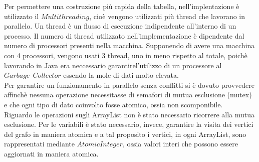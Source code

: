 Per permettere una costruzione pi\`u rapida della tabella, nell'implentazione \`e utilizzato il $ Multithreading $, cio\`e vengono utilizzati pi\`u thread che lavorano in parallelo.
Un thread \`e un flusso di esecuzione indipendente all'interno di un processo.
Il numero di thread utilizzato nell'implementazione \`e dipendente dal numero di processori presenti nella macchina.
Supponendo di avere una macchina con 4 processori, vengono usati 3 thread, uno in meno rispetto al totale, poich\`e lavorando in Java era neccessario garantirel'utilizzo di un processore al $ Garbage \ \  Collector $ essendo la mole di dati molto elevata.\\
Per garantire un funzionamento in parallelo senza conflitti si \`e dovuto provvedere affinch\`e nessuna operazione necessitasse di semafori di mutua esclusione (mutex) e che ogni tipo di dato coinvolto fosse atomico, ossia non scomponibile.\\
Riguardo le operazioni sugli ArrayList non \`e stato necessario ricorrere alla mutua esclusione.
Per le variabili \`e stato necessario, invece, garantire la visita dei vertici del grafo in maniera atomica e a tal proposito i vertici, in ogni ArrayList, sono rappresentati mediante $ AtomicInteger $, ossia valori interi che possono essere aggiornati in maniera atomica.\mbox{}\\



	
